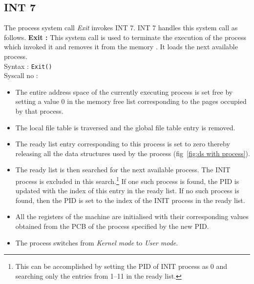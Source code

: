 \documentclass[10pt]{report}
\newcommand\counter[1]{\arabic{#1} \stepcounter{#1}}
\newcounter{syscall}
\begin{document}
\subsection{INT 7}
The process system call \textit{Exit} invokes INT 7. INT 7 handles this system call as follows.
\textbf{Exit :}  This system call is used to terminate the execution of the process which invoked it and removes it from the memory . It loads the next available process.\\
Syntax :  \texttt{Exit()}  \\
Syscall no : \counter{syscall}
\begin{itemize}
	\item The entire address space of the currently executing process is set free by setting a value 0 in the memory free list corresponding to the pages occupied by that process.
	
	\item The local file table is traversed and the global file table entry is removed.
	
	\item The ready list entry corresponding to this process is set to zero thereby releasing all the data structures used by the process (fig~\ref{fig:ds with process}).
	
	\item The ready list is then searched for the next available process. The INIT process is excluded in this search.\footnote{This can be accomplished by setting the PID of INIT process as 0 and searching only the entries from 1--11 in the ready list.} If one such process is found, the PID is updated with the index of this entry in the ready list. If no such process is found, then the PID is set to the index of the INIT process in the ready list.
	
	\item All the registers of the machine are initialised with their corresponding values obtained from the PCB of the process specified by the new PID.
	
	\item The process switches from \textit{Kernel mode} to \textit{User mode}.
\end{itemize}
\end{document}
